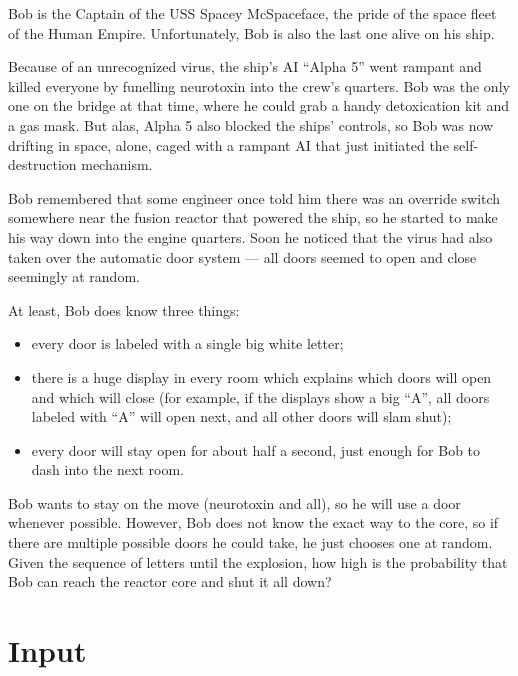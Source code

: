 
Bob is the Captain of the USS Spacey McSpaceface, the pride of the space fleet of the Human Empire.
Unfortunately, Bob is also the last one alive on his ship.

Because of an unrecognized virus, the ship's AI ``Alpha 5'' went rampant and killed everyone by funelling neurotoxin into the crew's quarters. 
Bob was the only one on the bridge at that time, where he could grab a handy detoxication kit and a gas mask.
But alas, Alpha 5 also blocked the ships' controls, so Bob was now drifting in space, alone, caged with a rampant AI that just initiated the self-destruction mechanism.

Bob remembered that some engineer once told him there was an override switch somewhere near the fusion reactor that powered the ship, so he started to make his way down into the engine quarters.
Soon he noticed that the virus had also taken over the automatic door system --- all doors seemed to open and close seemingly at random.

At least, Bob does know three things:
\begin{itemize}
    \item every door is labeled with a single big white letter;
    \item there is a huge display in every room which explains which doors will open and which will close (for example, if the displays show a big ``A'', all doors labeled with ``A'' will open next, and all other doors will slam shut);
    \item every door will stay open for about half a second, just enough for Bob to dash into the next room.
\end{itemize}

Bob wants to stay on the move (neurotoxin and all), so he will use a door whenever possible.
However, Bob does not know the exact way to the core, so if there are multiple possible doors he could take, he just chooses one at random.
Given the sequence of letters until the explosion, how high is the probability that Bob can reach the reactor core and shut it all down?

\section*{Input}

